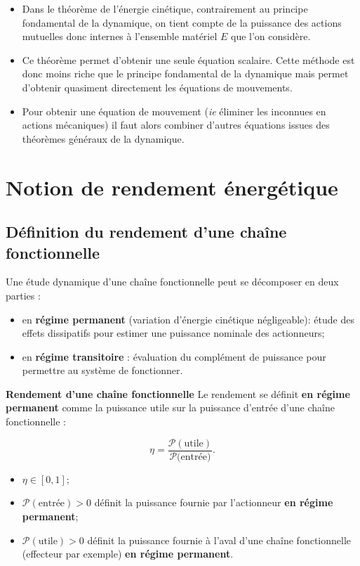 \begin{rem}%
\begin{itemize}
\item Dans le théorème de l'énergie cinétique, contrairement au principe fondamental de la dynamique, on tient compte de la puissance des actions mutuelles donc internes à l'ensemble matériel $E$ que l'on considère.
\item Ce théorème permet d'obtenir une seule équation scalaire. Cette méthode est donc moins riche que le principe fondamental de la dynamique mais permet d'obtenir quasiment directement les équations de mouvements.
\item Pour obtenir une équation de mouvement (\textit{ie} éliminer les inconnues en actions mécaniques) il faut alors combiner d'autres équations issues des théorèmes généraux de la dynamique.
\end{itemize}
\end{rem}%


\section{Notion de rendement énergétique}
\subsection{Définition du rendement d'une chaîne fonctionnelle}

Une étude dynamique d'une chaîne fonctionnelle peut se décomposer en deux parties :
\begin{itemize}
\item en \textbf{régime permanent} (variation d'énergie cinétique négligeable): étude des effets dissipatifs pour estimer une puissance nominale des actionneurs;
\item en \textbf{régime transitoire} : évaluation du complément de puissance pour permettre au système de fonctionner.
\end{itemize} 

\begin{defi}\textbf{Rendement d'une chaîne fonctionnelle}
Le rendement se définit \textbf{en régime permanent} comme la puissance utile sur la puissance d'entrée d'une chaîne fonctionnelle : 

$$
\eta=\dfrac{\mathcal{P}(\text{utile})}{\mathcal{P}(\text{entrée)}}.
$$

\begin{itemize}
\item $\eta\in\left[0,1\right]$;
\item $\mathcal{P}(\text{entrée})>0$ définit la puissance fournie par l'actionneur \textbf{en régime permanent};
\item $\mathcal{P}(\text{utile})>0$ définit la puissance fournie à l'aval d'une chaîne fonctionnelle (effecteur par exemple) \textbf{en régime permanent}.
\end{itemize}
\end{defi}

